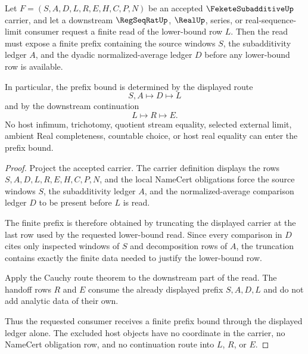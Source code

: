 \begin{theorem}
\label{thm:fekete-subadditive-finite-prefix-bound}
Let $F=(S,A,D,L,R,E,H,C,P,N)$ be an accepted $\FeketeSubadditiveUp$ carrier, and let a downstream $\RegSeqRatUp$, $\RealUp$, series, or real-sequence-limit consumer request a finite read of the lower-bound row $L$. Then the read must expose a finite prefix containing the source windows $S$, the subadditivity ledger $A$, and the dyadic normalized-average ledger $D$ before any lower-bound row is available.

In particular, the prefix bound is determined by the displayed route
$$
S,A\longmapsto D\longmapsto L
$$
and by the downstream continuation
$$
L\longmapsto R\longmapsto E .
$$
No host infimum, trichotomy, quotient stream equality, selected external limit, ambient Real completeness, countable choice, or host real equality can enter the prefix bound.
\end{theorem}
\begin{proof}
Project the accepted carrier. The carrier definition displays the rows $S,A,D,L,R,E,H,C,P,N$, and the local NameCert obligations force the source windows $S$, the subadditivity ledger $A$, and the normalized-average comparison ledger $D$ to be present before $L$ is read.

The finite prefix is therefore obtained by truncating the displayed carrier at the last row used by the requested lower-bound read. Since every comparison in $D$ cites only inspected windows of $S$ and decomposition rows of $A$, the truncation contains exactly the finite data needed to justify the lower-bound row.

Apply the Cauchy route theorem to the downstream part of the read. The handoff rows $R$ and $E$ consume the already displayed prefix $S,A,D,L$ and do not add analytic data of their own.

Thus the requested consumer receives a finite prefix bound through the displayed ledger alone. The excluded host objects have no coordinate in the carrier, no NameCert obligation row, and no continuation route into $L$, $R$, or $E$.
\end{proof}



